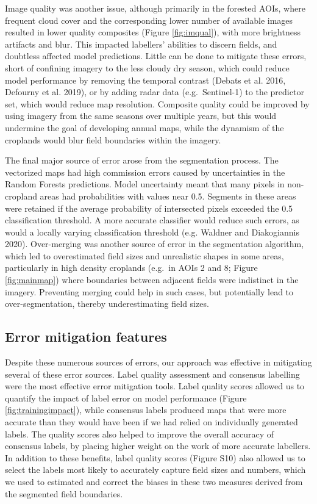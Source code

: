 \documentclass[11pt,a4paper]{article}
\begin{document}
Image quality was another issue, although primarily in the forested
AOIs, where frequent cloud cover and the corresponding lower number of
available images resulted in lower quality composites (Figure
\ref{fig:imqual}), with more brightness artifacts and blur. This
impacted labellers' abilities to discern fields, and doubtless affected
model predictions. Little can be done to mitigate these errors, short of
confining imagery to the less cloudy dry season, which could reduce
model performance by removing the temporal contrast (Debats et al. 2016,
Defourny et al. 2019), or by adding radar data (e.g.~Sentinel-1) to the
predictor set, which would reduce map resolution. Composite quality
could be improved by using imagery from the same seasons over multiple
years, but this would undermine the goal of developing annual maps,
while the dynamism of the croplands would blur field boundaries within
the imagery.

The final major source of error arose from the segmentation process. The
vectorized maps had high commission errors caused by uncertainties in
the Random Forests predictions. Model uncertainty meant that many pixels
in non-cropland areas had probabilities with values near 0.5. Segments
in these areas were retained if the average probability of intersected
pixels exceeded the 0.5 classification threshold. A more accurate
classifier would reduce such errors, as would a locally varying
classification threshold (e.g. Waldner and Diakogiannis 2020).
Over-merging was another source of error in the segmentation algorithm,
which led to overestimated field sizes and unrealistic shapes in some
areas, particularly in high density croplands (e.g.~in AOIs 2 and 8;
Figure \ref{fig:mainmap}) where boundaries between adjacent fields were
indistinct in the imagery. Preventing merging could help in such cases,
but potentially lead to over-segmentation, thereby underestimating field
sizes.

\hypertarget{error-mitigation-features}{%
\subsection{Error mitigation features}\label{error-mitigation-features}}

Despite these numerous sources of errors, our approach was effective in
mitigating several of these error sources. Label quality assessment and
consensus labelling were the most effective error mitigation tools.
Label quality scores allowed us to quantify the impact of label error on
model performance (Figure \ref{fig:trainingimpact}), while consensus
labels produced maps that were more accurate than they would have been
if we had relied on individually generated labels. The quality scores
also helped to improve the overall accuracy of consensus labels, by
placing higher weight on the work of more accurate labellers. In
addition to these benefits, label quality scores (Figure S10) also
allowed us to select the labels most likely to accurately capture field
sizes and numbers, which we used to estimated and correct the biases in
these two measures derived from the segmented field boundaries.
\end{document}

